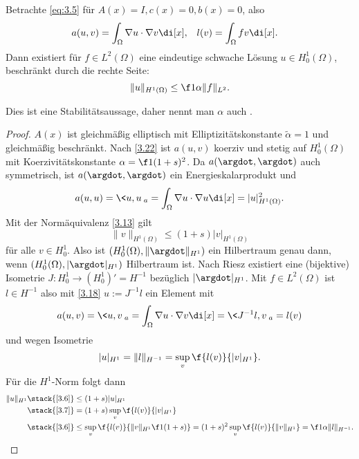\begin{st} \label{3.26}
	Betrachte \eqref{eq:3.5} für $A(x) = I, c(x) = 0, b(x) = 0$, also
	\begin{align*}
		a(u,v) &= \int_\Omega \nabla u \cdot \nabla v \di[x], &
		l(v) &= \int_\Omega f v \di[x].
	\end{align*}
	Dann existiert für $f \in L^2(\Omega)$ eine eindeutige schwache Lösung $u \in H_0^1(\Omega)$, beschränkt durch die rechte Seite:
	\[
		\|u\|_{H^1(\Omega)} \le \f 1{\alpha} \|f\|_{L^2}.
	\]
	\begin{note}
		Dies ist eine Stabilitätsaussage, daher nennt man $\alpha$ auch .
	\end{note}
	\begin{proof}
		$A(x)$ ist gleichmäßig elliptisch mit Elliptizitätskonstante $\tilde \alpha = 1$ und gleichmäßig beschränkt.
		Nach \ref{3.22} ist $a(u,v)$ koerziv und stetig auf $H_0^1(\Omega)$ mit Koerzivitätskonstante $\alpha = \f 1{(1+s)^2}$.
		Da $a(\argdot, \argdot)$ auch symmetrisch, ist $a(\argdot, \argdot)$ ein Energieskalarprodukt und
		\[
			a(u,u)
			= \<u,u\>_a
			= \int_\Omega \nabla u \cdot \nabla u \di[x]
			= |u|_{H^1(\Omega)}^2.
		\]
		Mit der Normäquivalenz \ref{3.13} gilt
		\begin{equation} \label{eq:3.6}
			\|v\|_{H^1(\Omega)}
			\le (1+s) |v|_{H^1(\Omega)}
		\end{equation}
		für alle $v \in H_0^1$.
		Also ist $(H_0^1(\Omega), \|\argdot\|_{H^1})$ ein Hilbertraum genau dann, wenn $(H_0^1(\Omega), |\argdot|_{H^1})$ Hilbertraum ist.
		Nach Riesz existiert eine (bijektive) Isometrie $J: H_0^1 \to (H_0^1)' = H^{-1}$ bezüglich $|\argdot|_{H^1}$.
		Mit $f \in L^2(\Omega)$ ist $l \in H^{-1}$ also mit \ref{3.18} $u := J^{-1} l$ ein Element mit
		\[
			a(u,v)
			= \<u,v\>_a
			= \int_\Omega \nabla u \cdot \nabla v \di[x]
			= \<J^{-1}l, v\>_a
			= l(v)
		\]
		und wegen Isometrie
		\begin{equation} \label{eq:3.7}
			|u|_{H^1} = \|l\|_{H^{-1}}
			= \sup_{v} \f{l(v)}{|v|_{H^1}}.
		\end{equation}
		Für die $H^1$-Norm folgt dann
		\begin{align*}
			\|u\|_{H^1}
			&\stack{\ref{3.6}}\le (1+s)|u|_{H^1} \\
			&\stack{\ref{3.7}}= (1+s) \sup_v \f{l(v)}{|v|_{H^1}} \\
			&\stack{\ref{3.6}}\le \sup_{v} \f{l(v)}{\|v\|_{H^1} \f 1{(1+s)}}
			= (1+s)^2 \sup_v \f{l(v)}{\|v\|_{H^1}}
			= \f 1{\alpha} \|l\|_{H^{-1}}.
		\end{align*}
	\end{proof}
\end{st}

